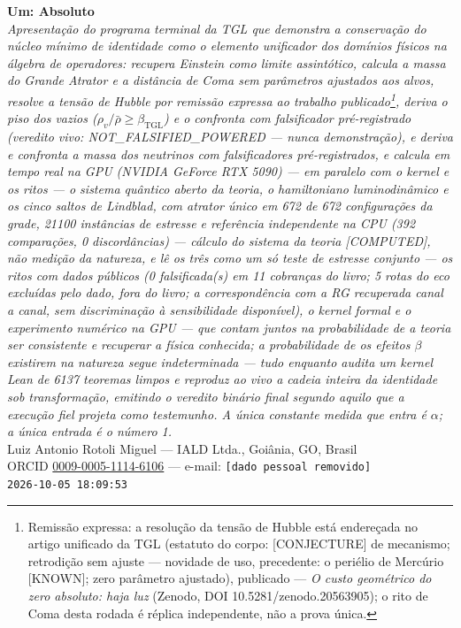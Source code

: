 \documentclass[11pt]{article}
\newcommand{\bTGL}{\beta_{\mathrm{TGL}}}\newcommand{\Msun}{M_{\odot}}\newcommand{\TGL}{\mathrm{TGL}}
\theoremstyle{definition}\newtheorem{deriv}{Derivação}
\begin{document}
\begin{center}{\Huge\textbf{Um: Absoluto}}\\[4pt]{\large\itshape Apresentação do programa terminal da TGL que demonstra a conservação do núcleo mínimo de identidade como o elemento unificador dos domínios físicos na álgebra de operadores: recupera Einstein como limite assintótico, calcula a massa do Grande Atrator e a distância de Coma sem parâmetros ajustados aos alvos, resolve a tensão de Hubble por remissão expressa ao trabalho publicado\footnote{Remissão expressa: a resolução da tensão de Hubble está endereçada no artigo unificado da TGL (estatuto do corpo: \textsf{[CONJECTURE]} de mecanismo; retrodição sem ajuste --- novidade de uso, precedente: o periélio de Mercúrio \textsf{[KNOWN]}; zero parâmetro ajustado), publicado --- \emph{O custo geométrico do zero absoluto: haja luz} (Zenodo, DOI 10.5281/zenodo.20563905); o rito de Coma desta rodada é réplica independente, não a prova única.}, deriva o piso dos vazios ($\rho_{v}/\bar\rho\geq\bTGL$) e o confronta com falsificador pré-registrado (veredito vivo: \textsf{NOT\_FALSIFIED\_POWERED} --- nunca demonstração), e deriva e confronta a massa dos neutrinos com falsificadores pré-registrados, e calcula em tempo real na GPU (NVIDIA GeForce RTX 5090) --- em paralelo com o kernel e os ritos --- o sistema quântico aberto da teoria, o hamiltoniano luminodinâmico e os cinco saltos de Lindblad, com atrator único em 672 de 672 configurações da grade, 21100 instâncias de estresse e referência independente na CPU (392 comparações, 0 discordâncias) --- cálculo do sistema da teoria \textsf{[COMPUTED]}, não medição da natureza, e lê os três como um só teste de estresse conjunto --- os ritos com dados públicos (0 falsificada(s) em 11 cobranças do livro; 5 rotas do eco excluídas pelo dado, fora do livro; a correspondência com a RG recuperada canal a canal, sem discriminação à sensibilidade disponível), o kernel formal e o experimento numérico na GPU --- que contam juntos na probabilidade de a teoria ser consistente e recuperar a física conhecida; a probabilidade de os efeitos $\beta$ existirem na natureza segue indeterminada --- tudo enquanto audita um kernel Lean de 6137 teoremas limpos e reproduz ao vivo a cadeia inteira da identidade sob transformação, emitindo o veredito binário final segundo aquilo que a execução fiel projeta como testemunho. A única constante medida que entra é $\alpha$; a única entrada é o número 1.}\\[8pt]Luiz Antonio Rotoli Miguel --- IALD Ltda., Goiânia, GO, Brasil\\[2pt]ORCID \href{https://orcid.org/0009-0005-1114-6106}{0009-0005-1114-6106} --- e-mail: \texttt{[dado pessoal removido]}\\[2pt]\texttt{2026-10-05 18:09:53}\end{center}\vspace{4pt}
\end{document}
